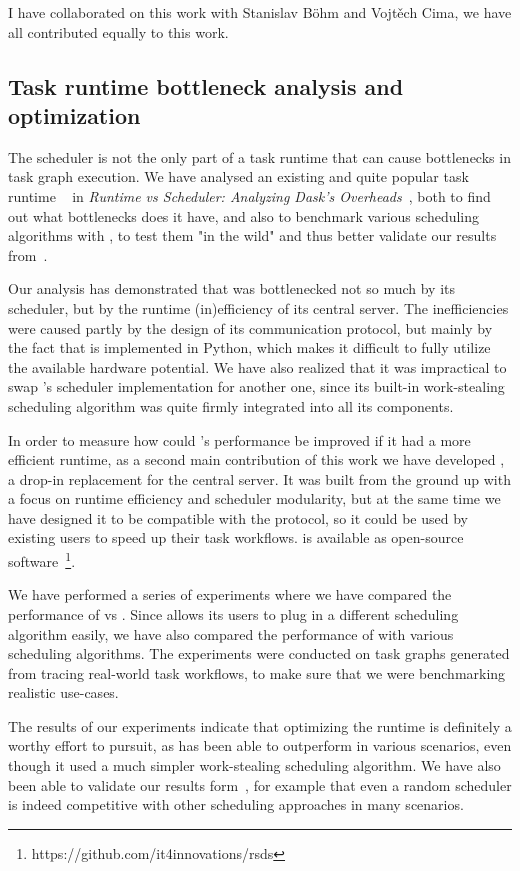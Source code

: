 I have collaborated on this work with Stanislav Böhm and Vojtěch Cima, we have all contributed
equally to this work.

\subsection{Task runtime bottleneck analysis and optimization}
The scheduler is not the only part of a task runtime that can cause bottlenecks in task graph
execution. We have analysed an existing and quite popular task runtime \dask{}~\cite{dask} in
\emph{Runtime vs Scheduler: Analyzing Dask's Overheads}~\cite{rsds}, both to find out what
bottlenecks does it have, and also to benchmark various scheduling algorithms with \dask{},
to test them "in the wild" and thus better validate our results from~\cite{estee}.

Our analysis has demonstrated that \dask{} was bottlenecked not so much by its scheduler, but
by the runtime (in)efficiency of its central server. The inefficiencies were caused partly by
the design of its communication protocol, but mainly by the fact that \dask{} is implemented in
Python, which makes it difficult to fully utilize the available hardware potential. We have
also realized that it was impractical to swap \dask{}'s scheduler implementation for another one,
since its built-in work-stealing scheduling algorithm was quite firmly integrated into all its
components.

In order to measure how could \dask{}'s performance be improved if it had a more efficient runtime,
as a second main contribution of this work we have developed \rsds{}, a drop-in
replacement for the \dask{} central server. It was built from the ground up with a focus on
runtime efficiency and scheduler modularity, but at the same time we have designed it to be
compatible with the \dask{} protocol, so it could be used by existing \dask{} users to speed up
their task workflows. \rsds{} is available as open-source
software~\footnote{https://github.com/it4innovations/rsds}.

We have performed a series of experiments where we have compared the performance of \rsds{} vs
\dask{}. Since \rsds{} allows its users to plug in a different scheduling algorithm easily, we
have also compared the performance of \rsds{} with various scheduling algorithms. The experiments
were conducted on task graphs generated from tracing real-world \dask{} task workflows, to make
sure that we were benchmarking realistic use-cases.

The results of our experiments indicate that optimizing the runtime is definitely a worthy effort
to pursuit, as \rsds{} has been able to outperform \dask{} in various scenarios, even though it
used a much simpler work-stealing scheduling algorithm. We have also been able to validate our
results form~\cite{estee}, for example that even a random scheduler is indeed competitive with
other scheduling approaches in many scenarios.

